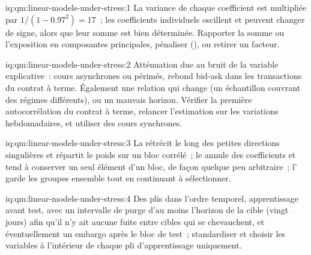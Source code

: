 \begin{solution}{iq:qm:linear-models-under-stress:1}
La variance de chaque coefficient est multipliée par $1/(1 - 0.97^2) = 17$~; les coefficients individuels oscillent et peuvent changer de signe, alors que leur somme est bien
déterminée. Rapporter la somme ou l'exposition en composantes principales, pénaliser (), ou retirer un facteur.
\end{solution}

\begin{solution}{iq:qm:linear-models-under-stress:2}
Atténuation due au bruit de la variable explicative~: cours asynchrones ou périmés, rebond bid-ask dans les transactions du contrat à terme. Également une relation qui change (un
échantillon couvrant des régimes différents), ou un mauvais horizon. Vérifier la première autocorrélation du contrat à terme, relancer l'estimation sur les variations hebdomadaires, et
utiliser des cours synchrones.
\end{solution}

\begin{solution}{iq:qm:linear-models-under-stress:3}
La  rétrécit le long des petites directions singulières et répartit le poids sur un bloc corrélé~; le  annule des coefficients et tend à
conserver un seul élément d'un bloc, de façon quelque peu arbitraire~; l' garde les groupes ensemble tout en continuant à sélectionner.
\end{solution}

\begin{solution}{iq:qm:linear-models-under-stress:4}
Des plis dans l'ordre temporel, apprentissage avant test, avec un intervalle de purge d'au moins l'horizon de la cible (vingt jours) afin qu'il n'y ait aucune fuite entre cibles qui se chevauchent,
et éventuellement un embargo après le bloc de test~; standardiser et choisir les variables à l'intérieur de chaque pli d'apprentissage uniquement.
\end{solution}

